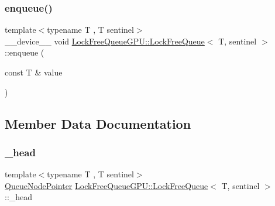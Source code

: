 \mbox{\label{class_lock_free_queue_g_p_u_1_1_lock_free_queue_a90dfa85e6684e6f8b446a7a6d61aa1f9}} 
\subsubsection{\texorpdfstring{enqueue()}{enqueue()}}
{\footnotesize\ttfamily template$<$typename T , T sentinel$>$ \\
\+\_\+\+\_\+device\+\_\+\+\_\+ void \mbox{\hyperlink{class_lock_free_queue_g_p_u_1_1_lock_free_queue}{Lock\+Free\+Queue\+G\+P\+U\+::\+Lock\+Free\+Queue}}$<$ T, sentinel $>$\+::enqueue (\begin{DoxyParamCaption}\item[{const T \&}]{value }\end{DoxyParamCaption})\hspace{0.3cm}{\ttfamily [inline]}}



\subsection{Member Data Documentation}
\mbox{\label{class_lock_free_queue_g_p_u_1_1_lock_free_queue_ad41f0126dfecb8bc1c0ef2f17aff1ca1}} 
\subsubsection{\texorpdfstring{\+\_\+head}{\_head}}
{\footnotesize\ttfamily template$<$typename T , T sentinel$>$ \\
\mbox{\hyperlink{class_lock_free_queue_g_p_u_1_1_lock_free_queue_1_1_queue_node_pointer}{Queue\+Node\+Pointer}} \mbox{\hyperlink{class_lock_free_queue_g_p_u_1_1_lock_free_queue}{Lock\+Free\+Queue\+G\+P\+U\+::\+Lock\+Free\+Queue}}$<$ T, sentinel $>$\+::\+\_\+head\hspace{0.3cm}{\ttfamily [private]}}

